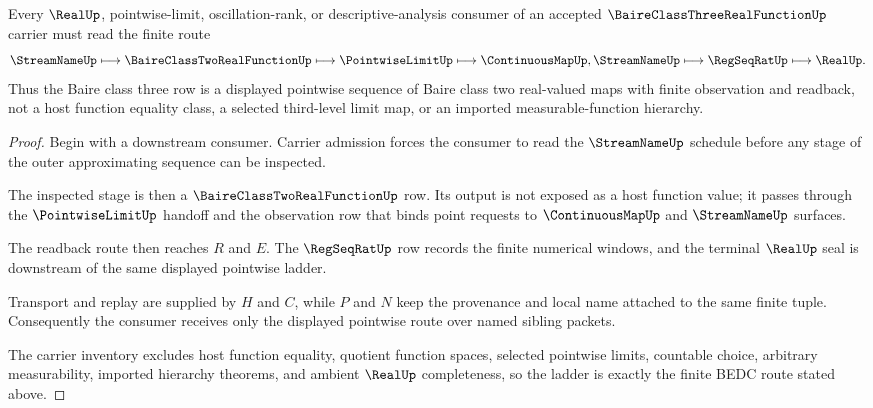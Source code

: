 \begin{theorem}
\label{thm:baire-class-three-real-function-pointwise-ladder}
Every $\RealUp$, pointwise-limit, oscillation-rank, or descriptive-analysis consumer of an accepted $\BaireClassThreeRealFunctionUp$ carrier must read the finite route
$$
\StreamNameUp
\longmapsto
\BaireClassTwoRealFunctionUp
\longmapsto
\PointwiseLimitUp
\longmapsto
\ContinuousMapUp,\StreamNameUp
\longmapsto
\RegSeqRatUp
\longmapsto
\RealUp .
$$
Thus the Baire class three row is a displayed pointwise sequence of Baire class two real-valued maps with finite observation and readback, not a host function equality class, a selected third-level limit map, or an imported measurable-function hierarchy.
\end{theorem}
\begin{proof}
Begin with a downstream consumer. Carrier admission forces the consumer to read the $\StreamNameUp$ schedule before any stage of the outer approximating sequence can be inspected.

The inspected stage is then a $\BaireClassTwoRealFunctionUp$ row. Its output is not exposed as a host function value; it passes through the $\PointwiseLimitUp$ handoff and the observation row that binds point requests to $\ContinuousMapUp$ and $\StreamNameUp$ surfaces.

The readback route then reaches $R$ and $E$. The $\RegSeqRatUp$ row records the finite numerical windows, and the terminal $\RealUp$ seal is downstream of the same displayed pointwise ladder.

Transport and replay are supplied by $H$ and $C$, while $P$ and $N$ keep the provenance and local name attached to the same finite tuple. Consequently the consumer receives only the displayed pointwise route over named sibling packets.

The carrier inventory excludes host function equality, quotient function spaces, selected pointwise limits, countable choice, arbitrary measurability, imported hierarchy theorems, and ambient $\RealUp$ completeness, so the ladder is exactly the finite BEDC route stated above.
\end{proof}


